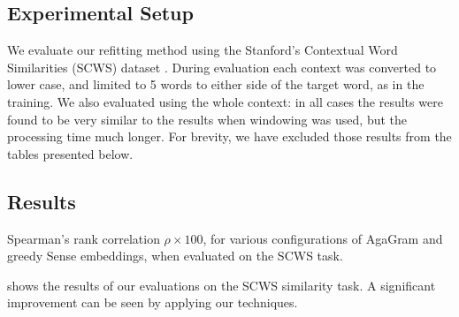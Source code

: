 \documentclass{sig-alternate}
\begin{document}
\subsection{Experimental Setup}
We evaluate our refitting method using the Stanford's Contextual Word Similarities (SCWS) dataset \parencite{Huang2012}.
During evaluation each context was converted to lower case, and limited to 5 words to either side of the target word, as in the training.
We also evaluated using the whole context: in all cases the results were found to be very similar to the results when windowing was used, but the processing time much longer.
For brevity, we have excluded those results from the tables presented below.


\subsection{Results}

\begin{table}
	\begin{adjustbox}{max width=\columnwidth}
	\end{adjustbox}

\caption{Spearman's rank correlation $\rho \times 100$, for various configurations of AgaGram and greedy Sense embeddings, when evaluated on the SCWS task.} \label{swscres}
\end{table}

 shows the results of our evaluations on the SCWS similarity task. A significant improvement can be seen by applying our techniques.
\end{document}
